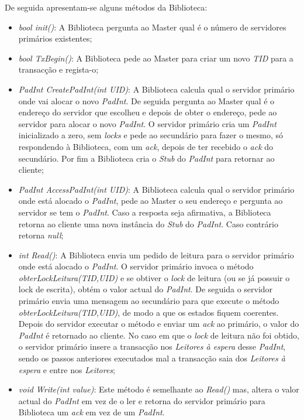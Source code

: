 De seguida apresentam-se alguns métodos da Biblioteca:
\begin{itemize}
\item \textit{bool init()}: A Biblioteca pergunta ao Master qual é o número de servidores primários existentes;
\item \textit{bool TxBegin()}: A Biblioteca pede ao Master para criar um novo \textit{TID} para a transacção e regista-o;
\item \textit{PadInt CreatePadInt(int UID)}: A Biblioteca calcula qual o servidor primário onde vai alocar o novo \textit{PadInt}. De seguida pergunta ao Master qual é o endereço do servidor que escolheu e depois de obter o endereço, pede ao servidor para alocar o novo \textit{PadInt}. O servidor primário cria um \textit{PadInt} inicializado a zero, sem \textit{locks} e pede ao secundário para fazer o mesmo, só respondendo à Biblioteca, com um \textit{ack}, depois de ter recebido o \textit{ack} do secundário. Por fim a Biblioteca cria o \textit{Stub} do \textit{PadInt} para retornar ao cliente;
\item \textit{PadInt AccessPadInt(int UID)}: A Biblioteca calcula qual o servidor primário onde está alocado o \textit{PadInt}, pede ao Master o seu endereço e pergunta ao servidor se tem o \textit{PadInt}. Caso a resposta seja afirmativa, a Biblioteca retorna ao cliente uma nova instância do \textit{Stub} do \textit{PadInt}. Caso contrário retorna \textit{null};
\item \textit{int Read()}: A Biblioteca envia um pedido de leitura para o servidor primário onde está alocado o \textit{PadInt}. O servidor primário invoca o método \textit{obterLockLeitura(TID,UID)} e se obtiver o \textit{lock} de leitura (ou se já possuir o lock de escrita), obtém o valor actual do \textit{PadInt}. De seguida o servidor primário envia uma mensagem ao secundário para que execute o método \textit{obterLockLeitura(TID,UID)}, de modo a que os estados fiquem coerentes. Depois do servidor executar o método e enviar um \textit{ack} ao primário, o valor do \textit{PadInt} é retornado ao cliente. No caso em que o \textit{lock} de leitura não foi obtido, o servidor primário insere a transacção nos \textit{Leitores à espera} desse \textit{PadInt}, sendo os passos anteriores executados mal a transacção saia dos \textit{Leitores à espera} e entre nos \textit{Leitores};
\item \textit{void Write(int value)}: Este método é semelhante ao \textit{Read()} mas, altera o valor actual do \textit{PadInt} em vez de o ler e retorna do servidor primário para Biblioteca um \textit{ack} em vez de um \textit{PadInt}.
\end{itemize}